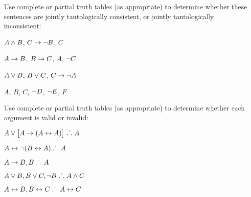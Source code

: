 \problempart
Use complete or partial truth tables (as appropriate) to determine whether these sentences are jointly tautologically consistent, or jointly tautologically inconsistent:
\begin{earg}
\item $A \wedge B$, $C\rightarrow \neg B$, $C$ %
\item $A\rightarrow B$, $B\rightarrow C$, $A$, $\neg C$ %
\item $A \vee B$, $B\vee C$, $C\rightarrow \neg A$ %
\item $A$, $B$, $C$, $\neg D$, $\neg E$, $F$ %
\end{earg}

\problempart
Use complete or partial truth tables (as appropriate) to determine whether each argument is valid or invalid:
\begin{earg}
\item $A\vee\bigl[A\rightarrow(A\leftrightarrow A)\bigr] \mathrel{\ldotp\dot{}\,\ldotp} A$ %
\item $A\leftrightarrow\neg(B\leftrightarrow A) \mathrel{\ldotp\dot{}\,\ldotp} A$ %
\item $A\rightarrow B, B \mathrel{\ldotp\dot{}\,\ldotp} A$ %
\item $A\vee B, B\vee C, \neg B \mathrel{\ldotp\dot{}\,\ldotp} A \wedge C$ %
\item $A\leftrightarrow B, B\leftrightarrow C \mathrel{\ldotp\dot{}\,\ldotp} A\leftrightarrow C$ %
\end{earg}